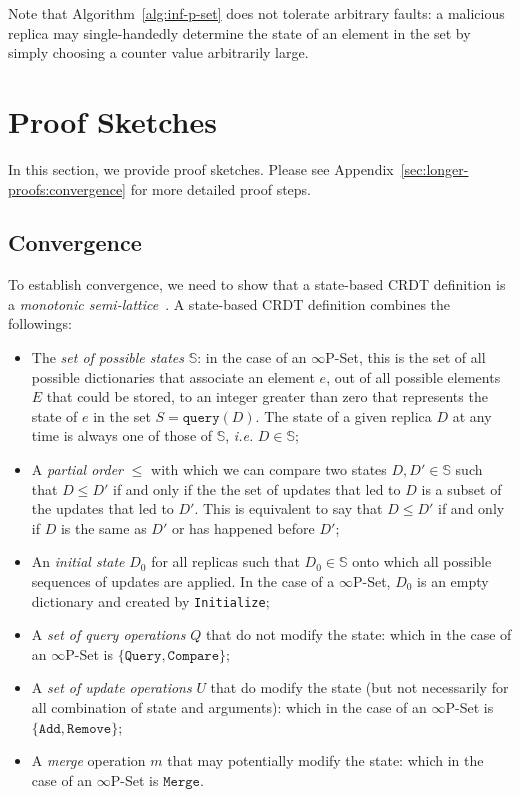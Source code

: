 \documentclass[9pt, oneside]{article}   	%
\begin{document}
Note that Algorithm~\ref{alg:inf-p-set} does not tolerate arbitrary faults: a malicious replica may single-handedly determine the state of an element in the set by simply choosing a counter value arbitrarily large.

\section{Proof Sketches}
\label{sec:proofs}

In this section, we provide proof sketches. Please see Appendix~\ref{sec:longer-proofs:convergence} for more detailed proof steps.

\subsection{Convergence}
\label{sec:proofs:convergence}

To establish convergence, we need to show that a state-based CRDT definition is a \textit{monotonic semi-lattice}~\cite{shapiro:hal-00932836}. A state-based CRDT definition combines the followings:
\begin{itemize}
	\item The \textit{set of possible states} $\mathds{S}$: in the case of an $\infty$P-Set, this is the set of all possible dictionaries that associate an element $e$, out of all possible elements $E$ that could be stored, to an integer greater than zero that represents the state of $e$ in the set $S = \texttt{query}(D)$. The state of a given replica $D$ at any time is always one of those of $\mathds{S}$, \textit{i.e.} $D \in \mathds{S}$;
	\item A \textit{partial order} $\leq$ with which we can compare two states $D, D' \in \mathds{S}$ such that $D \leq D'$ if and only if the the set of updates that led to $D$ is a subset of the updates that led to $D'$. This is equivalent to say that $D \leq D'$ if and only if $D$ is the same as $D'$ or has happened before $D'$;
	\item An \textit{initial state} $D_0$ for all replicas such that $D_0 \in \mathds{S}$ onto which all possible sequences of updates are applied. In the case of a $\infty$P-Set, $D_0$ is an empty dictionary and created by \texttt{Initialize};
	\item A \textit{set of query operations} $Q$ that do not modify the state: which in the case of an $\infty$P-Set is $\{ \texttt{Query}, \texttt{Compare} \}$;
	\item A \textit{set of update operations} $U$ that do modify the state (but not necessarily for all combination of state and arguments): which in the case of an $\infty$P-Set is $\{ \texttt{Add}, \texttt{Remove} \}$;
	\item A \textit{merge} operation $m$ that may potentially modify the state: which in the case of an $\infty$P-Set is ${ \texttt{Merge} }$.
\end{itemize}
\end{document}
